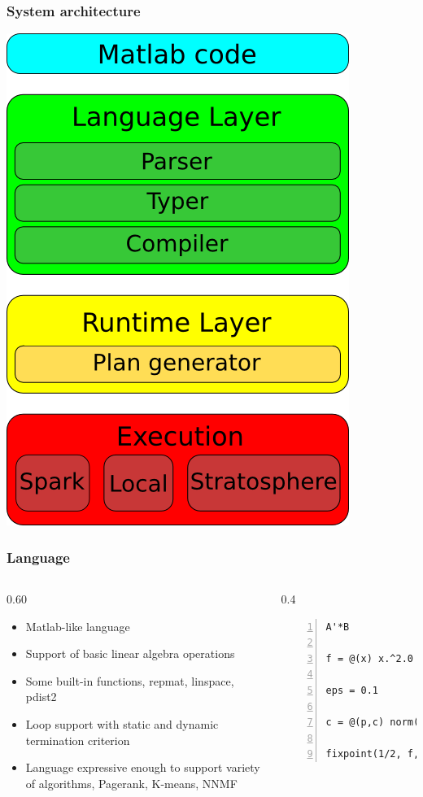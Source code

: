 \begin{frame}
	\frametitle{System architecture}
	\begin{center}
		\includegraphics[height=0.8\textheight]{images/architecture.png}
	\end{center}
\end{frame}

\begin{frame}[fragile]
	\frametitle{Language}
	\begin{columns}
		\begin{column}{0.60\textwidth}
			\begin{itemize}
				\item Matlab-like language
				\item Support of basic linear algebra operations
				\item Some built-in functions, repmat, linspace, pdist2
				\item Loop support with static and dynamic termination criterion
				\item Language expressive enough to support variety of algorithms, Pagerank, K-means, NNMF
			\end{itemize}
		\end{column}
		\begin{column}{0.4\textwidth}
			\begin{lstlisting}[basicstyle=\scriptsize, numbers=left, stepnumber=2]
A'*B

f = @(x) x.^2.0

eps = 0.1

c = @(p,c) norm(p-c,2) < eps

fixpoint(1/2, f, 10, c)
			\end{lstlisting}
		\end{column}
	\end{columns}
\end{frame}

